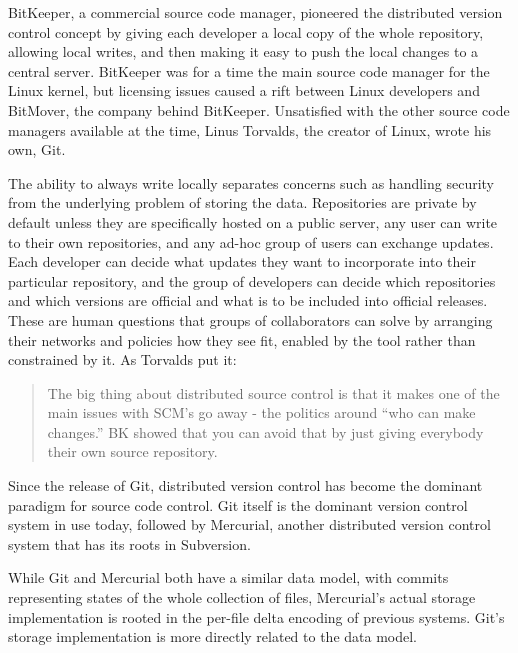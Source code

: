 BitKeeper, a commercial source code manager, pioneered the distributed version
control concept by giving each developer a local copy of the whole repository,
allowing local writes, and then making it easy to push the local changes to a
central server. BitKeeper was for a time the main source code manager for the
Linux kernel, but licensing issues caused a rift between Linux developers and
BitMover, the company behind BitKeeper. Unsatisfied with the other source code
managers available at the time, Linus Torvalds, the creator of Linux, wrote his
own, Git.

The ability to always write locally separates concerns such as handling security from the
underlying problem of storing the data. Repositories are private by default
unless they are specifically hosted on a public server, any user can write to
their own repositories, and any ad-hoc group of users can exchange updates. Each
developer can decide what updates they want to incorporate into their particular
repository, and the group of developers can decide which repositories and which
versions are official and what is to be included into official releases. These
are human questions that groups of collaborators can solve by arranging their
networks and policies how they see fit, enabled by the tool rather than
constrained by it. As Torvalds put it:

\blockcquote{git_10_years_interview}{The big thing about distributed source
    control is that it makes one of the main issues with SCM's go away - the
    politics around \enquote{who can make changes.} BK 
    showed that you can avoid that by just giving everybody their own source
repository. }


Since the release of Git, distributed version control has become the dominant
paradigm for source code control. Git itself is the dominant version control
system in use today, followed by Mercurial, another distributed version control
system that has its roots in Subversion.

While Git and Mercurial both have a similar data model, with commits
representing states of the whole collection of files, Mercurial's actual storage
implementation is rooted in the per-file delta encoding of previous systems.
Git's storage implementation is more directly related to the data model.

